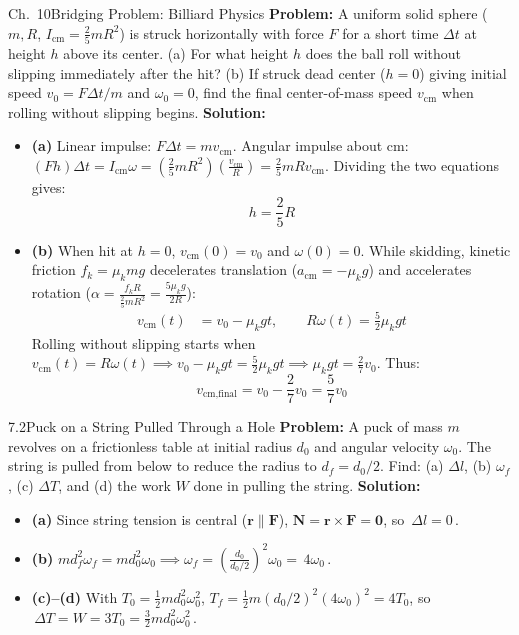 \documentclass[11pt,a4paper,openany,oneside]{book}
\newcommand{\eqbox}[1]{\boxed{\,#1\,}}
\newcommand{\vect}[1]{\mathbf{#1}}
\numberwithin{equation}{chapter}
\newcommand{\bk}[1]{\texorpdfstring{\enspace{\normalfont\small\color{slate}[Book #1]}}{ [Book #1]}}
\begin{document}
\begin{example}{Ch.\ 10}{Bridging Problem: Billiard Physics\bk{p.\ 332}}
\textbf{Problem:} A uniform solid sphere ($m, R$, $I_{\text{cm}} = \frac{2}{5}mR^2$) is struck horizontally with force $F$ for a short time $\Delta t$ at height $h$ above its center. (a) For what height $h$ does the ball roll without slipping immediately after the hit? (b) If struck dead center ($h=0$) giving initial speed $v_0 = F\Delta t/m$ and $\omega_0 = 0$, find the final center-of-mass speed $v_{\text{cm}}$ when rolling without slipping begins.
\tcblower
\textbf{Solution:}
\begin{itemize}
  \item \textbf{(a)} Linear impulse: $F\Delta t = mv_{\text{cm}}$. Angular impulse about cm: $(Fh)\Delta t = I_{\text{cm}}\omega = \left(\frac{2}{5}mR^2\right)\!\left(\frac{v_{\text{cm}}}{R}\right) = \frac{2}{5}mRv_{\text{cm}}$. Dividing the two equations gives:
  \begin{equation*}
    \eqbox{h = \frac{2}{5}R}
  \end{equation*}
  \item \textbf{(b)} When hit at $h=0$, $v_{\text{cm}}(0) = v_0$ and $\omega(0) = 0$. While skidding, kinetic friction $f_k = \mu_k mg$ decelerates translation ($a_{\text{cm}} = -\mu_k g$) and accelerates rotation ($\alpha = \frac{f_k R}{\frac{2}{5}mR^2} = \frac{5\mu_k g}{2R}$):
  \begin{align*}
    v_{\text{cm}}(t) &= v_0 - \mu_k gt, \qquad R\omega(t) = \frac{5}{2}\mu_k gt
  \end{align*}
  Rolling without slipping starts when $v_{\text{cm}}(t) = R\omega(t) \implies v_0 - \mu_k gt = \frac{5}{2}\mu_k gt \implies \mu_k gt = \frac{2}{7}v_0$. Thus:
  \begin{equation*}
    \eqbox{v_{\text{cm,final}} = v_0 - \frac{2}{7}v_0 = \frac{5}{7}v_0}
  \end{equation*}
\end{itemize}
\end{example}

\begin{example}{7.2}{Puck on a String Pulled Through a Hole\bk{Analytical Mechanics p.\ 183}}
\textbf{Problem:} A puck of mass $m$ revolves on a frictionless table at initial radius $d_0$ and angular velocity $\omega_0$. The string is pulled from below to reduce the radius to $d_f = d_0/2$. Find: (a) $\Delta l$, (b) $\omega_f$, (c) $\Delta T$, and (d) the work $W$ done in pulling the string.
\tcblower
\textbf{Solution:}
\begin{itemize}
  \item \textbf{(a)} Since string tension is central ($\vect{r}\parallel\vect{F}$), $\vect{N} = \vect{r}\times\vect{F} = \vect{0}$, so $\eqbox{\Delta l = 0}$.
  \item \textbf{(b)} $md_f^2\omega_f = md_0^2\omega_0 \implies \omega_f = \left(\frac{d_0}{d_0/2}\right)^2\omega_0 = \eqbox{4\omega_0}$.
  \item \textbf{(c)--(d)} With $T_0 = \frac{1}{2}md_0^2\omega_0^2$, $T_f = \frac{1}{2}m(d_0/2)^2(4\omega_0)^2 = 4T_0$, so $\eqbox{\Delta T = W = 3T_0 = \frac{3}{2}md_0^2\omega_0^2}$.
\end{itemize}
\end{example}
\end{document}
